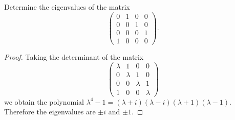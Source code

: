\documentclass[10pt]{amsart}
\begin{document}
\begin{thm}
  \label{Ex3}
  Determine the eigenvalues of the matrix
  $$
  \begin{pmatrix}
    0 & 1 & 0 & 0\\
    0 & 0 & 1 & 0\\
    0 & 0 & 0 & 1\\
    1 & 0 & 0 & 0
  \end{pmatrix}.
  $$
  \begin{proof}
    Taking the determinant of the matrix
    $$
  \begin{pmatrix}
    \lambda & 1 & 0 & 0\\
    0 & \lambda & 1 & 0\\
    0 & 0 & \lambda & 1\\
    1 & 0 & 0 & \lambda
  \end{pmatrix}
  $$
  we obtain the polynomial  $\lambda^4 - 1 = (\lambda+i)(\lambda - i )(\lambda+1)(\lambda-1)$.
  Therefore the eigenvalues are $\pm i$ and $\pm 1$.
  \end{proof}
\end{thm}
\end{document}
